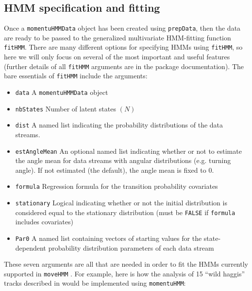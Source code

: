 \documentclass[12pt]{article}\usepackage[]{graphicx}\usepackage[]{color}
\begin{document}
\subsection{HMM specification and fitting}
Once a \verb|momentuHMMData| object has been created using \verb|prepData|, then the data are ready to be passed to the generalized multivariate HMM-fitting function \verb|fitHMM|. There are many different options for specifying HMMs using \verb|fitHMM|, so here we will only focus on several of the most important and useful features (further details of all \verb|fitHMM| arguments are in the package documentation). The bare essentials of \verb|fitHMM| include the arguments:
\begin{itemize}
  \item{\verb|data|} A \verb|momentuHMMData| object
  \item{\verb|nbStates|} Number of latent states $(N)$
  \item{\verb|dist|} A named list indicating the probability distributions of the data streams.
  \item{\verb|estAngleMean|} An optional named list indicating whether or not to estimate the angle mean for data streams with angular distributions (e.g. turning angle). If not estimated (the default), the angle mean is fixed to 0.
  \item{\verb|formula|} Regression formula for the transition probability covariates
  \item{\verb|stationary|} Logical indicating whether or not the initial distribution is considered equal to the stationary distribution (must be \verb|FALSE| if \verb|formula| includes covariates) 
  \item{\verb|Par0|} A named list containing vectors of starting values for the state-dependent probability distribution parameters of each data stream
\end{itemize}
These seven arguments are all that are needed in order to fit the HMMs currently supported in \verb|moveHMM| \citep{MichelotEtAl2016}. For example, here is how the analysis of 15 ``wild haggis'' tracks described in \cite{MichelotEtAl2016} would be implemented using \verb|momentuHMM|:
\end{document}
